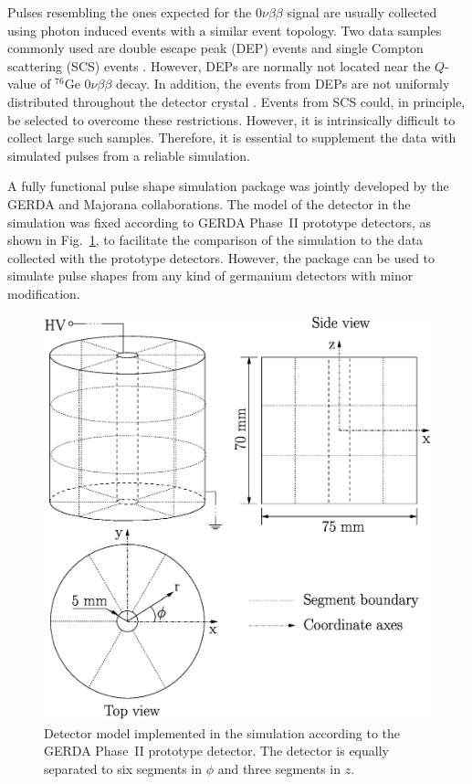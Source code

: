 \documentclass[epj]{svjour}
\begin{document}
Pulses resembling the ones expected for the $0\nu\beta\beta$ signal
are usually collected using photon induced events with a similar event
topology. Two data samples commonly used are double escape peak (DEP)
events and single Compton scattering (SCS) events \cite{scs}.
However, DEPs are normally not located near the $Q$-value of $^{76}$Ge
$0\nu\beta\beta$ decay. In addition, the events from DEPs are not
uniformly distributed throughout the detector crystal
\cite{psam}. Events from SCS could, in principle, be selected to
overcome these restrictions. However, it is intrinsically difficult to
collect large such samples. Therefore, it is essential to supplement
the data with simulated pulses from a reliable simulation.

A fully functional pulse shape simulation package was jointly
developed by the GERDA and Majorana \cite{Gai03,Aal04}
collaborations. The model of the detector in the simulation was fixed
according to GERDA Phase~II prototype detectors, as shown in
Fig.~\ref{f:model}, to facilitate the comparison of the simulation to
the data collected with the prototype detectors. However, the package
can be used to simulate pulse shapes from any kind of germanium
detectors with minor modification.

\begin{figure}[htbp]
\centering
\includegraphics[width=0.85\linewidth]{model}
\caption{Detector model implemented in the simulation according to the
GERDA Phase~II prototype detector. The detector is equally separated
to six segments in $\phi$ and three segments in $z$.}
\label{f:model}
\end{figure}
\end{document}
